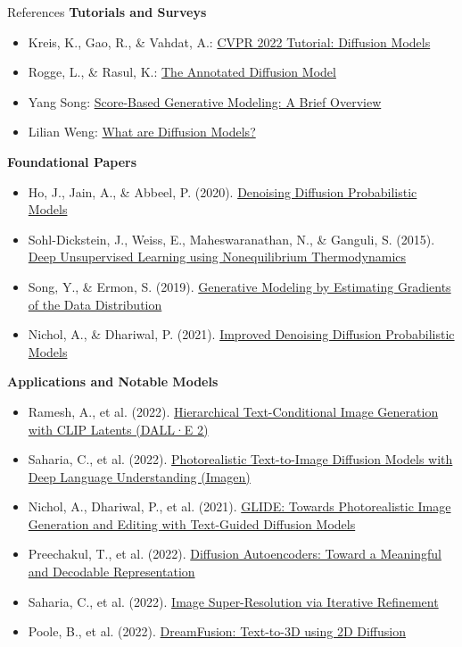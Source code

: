 \begin{frame}[allowframebreaks]{References}
\textbf{Tutorials and Surveys}
\begin{itemize}
    \item Kreis, K., Gao, R., \& Vahdat, A.: \href{https://cvpr2022-tutorial-diffusion-models.github.io/}{CVPR 2022 Tutorial: Diffusion Models}
    \item Rogge, L., \& Rasul, K.: \href{https://huggingface.co/blog/annotated-diffusion}{The Annotated Diffusion Model}
    \item Yang Song: \href{https://yang-song.github.io/blog/2021/score/}{Score-Based Generative Modeling: A Brief Overview}
    \item Lilian Weng: \href{https://lilianweng.github.io/posts/2021-07-11-diffusion-models/}{What are Diffusion Models?}
\end{itemize}

\framebreak

\textbf{Foundational Papers}
\begin{itemize}
    \item Ho, J., Jain, A., \& Abbeel, P. (2020). \href{https://arxiv.org/abs/2006.11239}{Denoising Diffusion Probabilistic Models}
    \item Sohl-Dickstein, J., Weiss, E., Maheswaranathan, N., \& Ganguli, S. (2015). \href{https://arxiv.org/abs/1503.03585}{Deep Unsupervised Learning using Nonequilibrium Thermodynamics}
    \item Song, Y., \& Ermon, S. (2019). \href{https://arxiv.org/abs/1907.05600}{Generative Modeling by Estimating Gradients of the Data Distribution}
    \item Nichol, A., \& Dhariwal, P. (2021). \href{https://arxiv.org/abs/2102.09672}{Improved Denoising Diffusion Probabilistic Models}
\end{itemize}

\framebreak

\textbf{Applications and Notable Models}
\begin{itemize}
    \item Ramesh, A., et al. (2022). \href{https://arxiv.org/abs/2204.06125}{Hierarchical Text-Conditional Image Generation with CLIP Latents (DALL·E 2)}
    \item Saharia, C., et al. (2022). \href{https://arxiv.org/abs/2205.11487}{Photorealistic Text-to-Image Diffusion Models with Deep Language Understanding (Imagen)}
    \item Nichol, A., Dhariwal, P., et al. (2021). \href{https://arxiv.org/abs/2112.10752}{GLIDE: Towards Photorealistic Image Generation and Editing with Text-Guided Diffusion Models}
    \item Preechakul, T., et al. (2022). \href{https://arxiv.org/abs/2201.09865}{Diffusion Autoencoders: Toward a Meaningful and Decodable Representation}
    \item Saharia, C., et al. (2022). \href{https://arxiv.org/abs/2104.07636}{Image Super-Resolution via Iterative Refinement}
    \item Poole, B., et al. (2022). \href{https://arxiv.org/abs/2206.02736}{DreamFusion: Text-to-3D using 2D Diffusion}
\end{itemize}


\end{frame}
